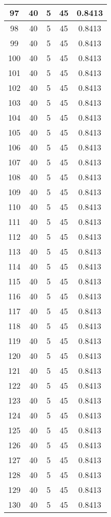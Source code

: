 \documentclass[letterpaper, 12pt]{article}
\begin{document}
\begin{longtable}{|c|c|c|c|c|}
\hline
97 & 40 & 5 & 45 & 0.8413 \\
\hline
98 & 40 & 5 & 45 & 0.8413 \\
\hline
99 & 40 & 5 & 45 & 0.8413 \\
\hline
100 & 40 & 5 & 45 & 0.8413 \\
\hline
101 & 40 & 5 & 45 & 0.8413 \\
\hline
102 & 40 & 5 & 45 & 0.8413 \\
\hline
103 & 40 & 5 & 45 & 0.8413 \\
\hline
104 & 40 & 5 & 45 & 0.8413 \\
\hline
105 & 40 & 5 & 45 & 0.8413 \\
\hline
106 & 40 & 5 & 45 & 0.8413 \\
\hline
107 & 40 & 5 & 45 & 0.8413 \\
\hline
108 & 40 & 5 & 45 & 0.8413 \\
\hline
109 & 40 & 5 & 45 & 0.8413 \\
\hline
110 & 40 & 5 & 45 & 0.8413 \\
\hline
111 & 40 & 5 & 45 & 0.8413 \\
\hline
112 & 40 & 5 & 45 & 0.8413 \\
\hline
113 & 40 & 5 & 45 & 0.8413 \\
\hline
114 & 40 & 5 & 45 & 0.8413 \\
\hline
115 & 40 & 5 & 45 & 0.8413 \\
\hline
116 & 40 & 5 & 45 & 0.8413 \\
\hline
117 & 40 & 5 & 45 & 0.8413 \\
\hline
118 & 40 & 5 & 45 & 0.8413 \\
\hline
119 & 40 & 5 & 45 & 0.8413 \\
\hline
120 & 40 & 5 & 45 & 0.8413 \\
\hline
121 & 40 & 5 & 45 & 0.8413 \\
\hline
122 & 40 & 5 & 45 & 0.8413 \\
\hline
123 & 40 & 5 & 45 & 0.8413 \\
\hline
124 & 40 & 5 & 45 & 0.8413 \\
\hline
125 & 40 & 5 & 45 & 0.8413 \\
\hline
126 & 40 & 5 & 45 & 0.8413 \\
\hline
127 & 40 & 5 & 45 & 0.8413 \\
\hline
128 & 40 & 5 & 45 & 0.8413 \\
\hline
129 & 40 & 5 & 45 & 0.8413 \\
\hline
130 & 40 & 5 & 45 & 0.8413 \\

\end{longtable}
\end{document}
